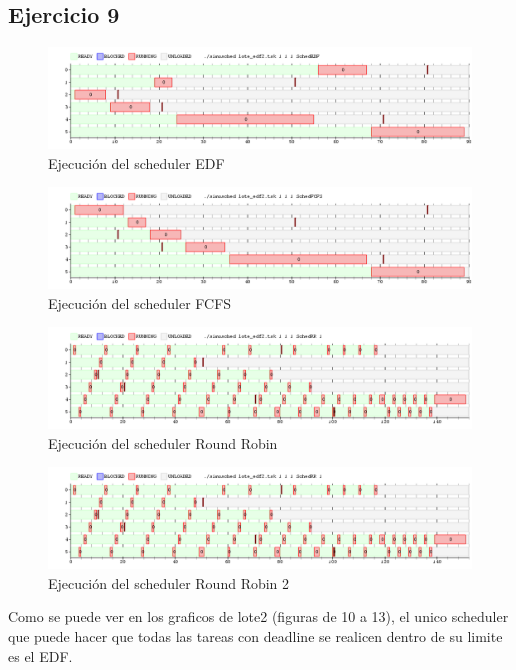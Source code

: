 \subsection{Ejercicio 9}
  \begin{figure}
  \includegraphics[scale=0.32]{images/lote2.png}
  \caption{Ejecuci\'on del scheduler EDF}
  \end{figure}
  \begin{figure}
  \includegraphics[scale=0.32]{images/lote2fcfs.png}
  \caption{Ejecuci\'on del scheduler FCFS}
  \end{figure}
  \begin{figure}
  \includegraphics[scale=0.32]{images/lote2rr.png}
  \caption{Ejecuci\'on del scheduler Round Robin}
  \end{figure}
  \begin{figure}
  \includegraphics[scale=0.32]{images/lote2rr2.png}
  \caption{Ejecuci\'on del scheduler Round Robin 2}
  \end{figure}
Como se puede ver en los graficos de lote2 (figuras de 10 a 13), el unico scheduler que puede hacer que todas las tareas con deadline se realicen dentro de su limite es el EDF.
